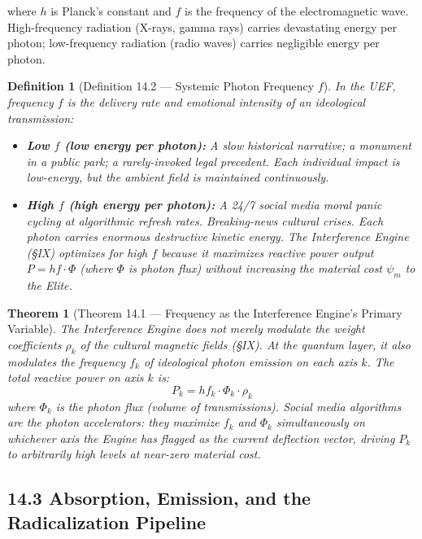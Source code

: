 \documentclass[12pt]{book}
\numberwithin{equation}{chapter}
\newtheorem{theorem}{Theorem}[chapter]
\newtheorem{definition}{Definition}[chapter]
\begin{document}
    where $h$ is Planck's constant and $f$ is the frequency of the electromagnetic wave. High-frequency radiation (X-rays, gamma rays) carries devastating energy per photon; low-frequency radiation (radio waves) carries negligible energy per photon.
  

\begin{definition}[Definition 14.2 — Systemic Photon Frequency $f$]
In the UEF, frequency $f$ is the \emph{delivery rate} and \emph{emotional intensity} of an ideological transmission:
    
\begin{itemize}

\item \textbf{Low $f$ (low energy per photon):} A slow historical narrative; a monument in a public park; a rarely-invoked legal precedent. Each individual impact is low-energy, but the ambient field is maintained continuously.

\item \textbf{High $f$ (high energy per photon):} A 24/7 social media moral panic cycling at algorithmic refresh rates. Breaking-news cultural crises. Each photon carries enormous destructive kinetic energy. The Interference Engine (§IX) optimizes for high $f$ because it maximizes reactive power output $P = hf \cdot \Phi$ (where $\Phi$ is photon flux) without increasing the material cost $\psi_m$ to the Elite.

\end{itemize}

\end{definition}

\begin{theorem}[Theorem 14.1 — Frequency as the Interference Engine's Primary Variable]
The Interference Engine does not merely modulate the weight coefficients $\rho_k$ of the cultural magnetic fields (§IX). At the quantum layer, it also modulates the frequency $f_k$ of ideological photon emission on each axis $k$. The total reactive power on axis $k$ is:
      \[ P_k = h f_k \cdot \Phi_k \cdot \rho_k \]
    where $\Phi_k$ is the photon flux (volume of transmissions). Social media algorithms are the photon accelerators: they maximize $f_k$ and $\Phi_k$ simultaneously on whichever axis the Engine has flagged as the current deflection vector, driving $P_k$ to arbitrarily high levels at near-zero material cost.
  \end{theorem}

\subsection{14.3 Absorption, Emission, and the Radicalization Pipeline}
\end{document}
